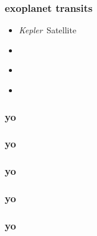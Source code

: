 \documentclass{beamer}
\newcommand{\project}[1]{\textsl{#1}}
\newcommand{\Kepler}{\project{Kepler}}
\begin{document}
\begin{frame}
  \frametitle{exoplanet transits}
  \begin{itemize}
  \item \Kepler\ Satellite
  \item ~
  \item ~
  \item ~
  \end{itemize}
\end{frame}

\begin{frame}
  \frametitle{yo}
\end{frame}

\begin{frame}
  \frametitle{yo}
\end{frame}

\begin{frame}
  \frametitle{yo}
\end{frame}

\begin{frame}
  \frametitle{yo}
\end{frame}

\begin{frame}
  \frametitle{yo}
\end{frame}
\end{document}
